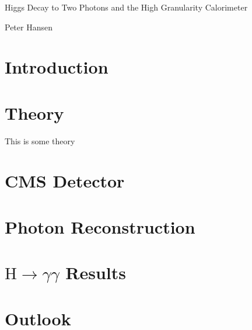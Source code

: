 \documentclass[a4paper,12pt]{article}
\newcommand{\hgg}{$\textrm{H} \rightarrow \gamma\gamma$ }
\begin{document}
\begin{center}
    \huge Higgs Decay to Two Photons and the High Granularity Calorimeter
\end{center}
\begin{center}
    \large Peter Hansen
\end{center}

\section{Introduction}
\section{Theory}
This is some theory \cite{CMSHiggs} \cite{HiggsGGTheory}
\section{CMS Detector}
\section{Photon Reconstruction}
\section{\hgg  Results}
\section{Outlook}

{}

\end{document}
